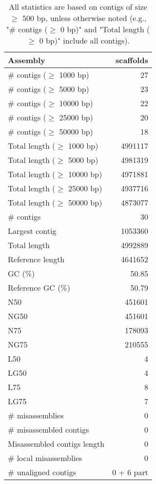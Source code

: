 \documentclass[12pt,a4paper]{article}
\begin{document}
\begin{table}[ht]
\begin{center}
\caption{All statistics are based on contigs of size $\geq$ 500 bp, unless otherwise noted (e.g., "\# contigs ($\geq$ 0 bp)" and "Total length ($\geq$ 0 bp)" include all contigs).}
\begin{tabular}{|l*{1}{|r}|}
\hline
Assembly & scaffolds \\ \hline
\# contigs ($\geq$ 1000 bp) & 27 \\ \hline
\# contigs ($\geq$ 5000 bp) & 23 \\ \hline
\# contigs ($\geq$ 10000 bp) & 22 \\ \hline
\# contigs ($\geq$ 25000 bp) & 20 \\ \hline
\# contigs ($\geq$ 50000 bp) & 18 \\ \hline
Total length ($\geq$ 1000 bp) & 4991117 \\ \hline
Total length ($\geq$ 5000 bp) & 4981319 \\ \hline
Total length ($\geq$ 10000 bp) & 4971881 \\ \hline
Total length ($\geq$ 25000 bp) & 4937716 \\ \hline
Total length ($\geq$ 50000 bp) & 4873077 \\ \hline
\# contigs & 30 \\ \hline
Largest contig & 1053360 \\ \hline
Total length & 4992889 \\ \hline
Reference length & 4641652 \\ \hline
GC (\%) & 50.85 \\ \hline
Reference GC (\%) & 50.79 \\ \hline
N50 & 451601 \\ \hline
NG50 & 451601 \\ \hline
N75 & 178093 \\ \hline
NG75 & 210555 \\ \hline
L50 & 4 \\ \hline
LG50 & 4 \\ \hline
L75 & 8 \\ \hline
LG75 & 7 \\ \hline
\# misassemblies & 0 \\ \hline
\# misassembled contigs & 0 \\ \hline
Misassembled contigs length & 0 \\ \hline
\# local misassemblies & 0 \\ \hline
\# unaligned contigs & 0 + 6 part \\ \hline

\end{tabular}
\end{center}
\end{table}
\end{document}
